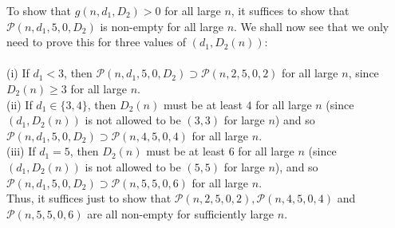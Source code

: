 \documentclass{article}
\newtheorem{Proof of Theorem}{Proof of Theorem}
\begin{document}
To show that $g(n,d_{1},D_{2})>0$ for all large $n$,
it suffices to show that $\mathcal{P}(n,d_{1},5,0,D_{2})$ is non-empty for all large $n$.
We shall now see that we only need to prove this for three values of $(d_{1},D_{2}(n))$: \\
\\
(i) If $d_{1}<3$,
then $\mathcal{P}(n,d_{1},5,0,D_{2}) \supset \mathcal{P}(n,2,5,0,2)$ for all large $n$, 
since $D_{2}(n) \geq 3$ for all large $n$. \\
(ii) If $d_{1} \in \{3,4\}$,
then $D_{2}(n)$ must be at least $4$ for all large $n$ 
(since $(d_{1},D_{2}(n))$ is not allowed to be $(3,3)$ for large $n$)
and so $\mathcal{P}(n,d_{1},5,0,D_{2}) \supset \mathcal{P}(n,4,5,0,4)$ for all large $n$. \\
(iii) If $d_{1}=5$, then $D_{2}(n)$ must be at least $6$ for all large $n$
(since $(d_{1},D_{2}(n))$ is not allowed to be $(5,5)$ for large $n$),
and so $\mathcal{P}(n,d_{1},5,0,D_{2}) \supset \mathcal{P}(n,5,5,0,6)$ for all large $n$. \\
Thus, it suffices just to show that 
$\mathcal{P}(n,2,5,0,2), \mathcal{P}(n,4,5,0,4)$ and $\mathcal{P}(n,5,5,0,6)$ 
are all non-empty for sufficiently large $n$.
\end{document}
